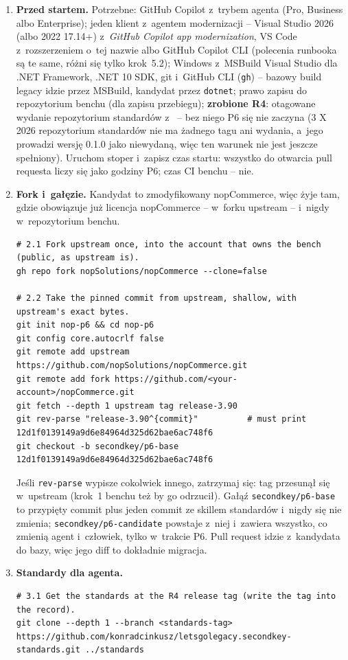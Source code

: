 \begin{enumerate}
  \item \textbf{Przed startem.} Potrzebne: GitHub Copilot z~trybem agenta (Pro, Business
    albo Enterprise); jeden klient z~agentem modernizacji -- Visual Studio 2026 (albo 2022
    17.14+) z~\emph{GitHub Copilot app modernization}, VS Code z~rozszerzeniem o~tej nazwie
    albo GitHub Copilot CLI (polecenia runbooka są te same, różni się tylko krok~5.2);
    Windows z~MSBuild Visual Studio dla .NET Framework, .NET 10 SDK, git i~GitHub CLI
    (\texttt{gh}) -- bazowy build legacy idzie przez MSBuild, kandydat przez
    \texttt{dotnet}; prawo zapisu do repozytorium benchu (dla zapisu przebiegu);
    \textbf{zrobione R4}: otagowane wydanie repozytorium standardów z~
    -- bez niego P6 się nie zaczyna (3 X 2026 repozytorium standardów nie ma żadnego tagu ani
    wydania, a~jego  prowadzi wersję 0.1.0 jako niewydaną, więc ten warunek
    nie jest jeszcze spełniony). Uruchom stoper i~zapisz czas startu: wszystko do
    otwarcia pull requesta liczy się jako godziny P6; czas CI benchu -- nie.
  \item \textbf{Fork i~gałęzie.} Kandydat to zmodyfikowany nopCommerce, więc żyje tam, gdzie
    obowiązuje już licencja nopCommerce -- w~forku upstream -- i~nigdy w~repozytorium
    benchu.
\begin{lstlisting}
# 2.1 Fork upstream once, into the account that owns the bench (public, as upstream is).
gh repo fork nopSolutions/nopCommerce --clone=false

# 2.2 Take the pinned commit from upstream, shallow, with upstream's exact bytes.
git init nop-p6 && cd nop-p6
git config core.autocrlf false
git remote add upstream https://github.com/nopSolutions/nopCommerce.git
git remote add fork https://github.com/<your-account>/nopCommerce.git
git fetch --depth 1 upstream tag release-3.90
git rev-parse "release-3.90^{commit}"          # must print 12d1f0139149a9d6e84964d325d62bae6ac748f6
git checkout -b secondkey/p6-base 12d1f0139149a9d6e84964d325d62bae6ac748f6
\end{lstlisting}
    Jeśli \texttt{rev-parse} wypisze cokolwiek innego, zatrzymaj się: tag przesunął się
    w~upstream (krok~1 benchu też by go odrzucił). Gałąź \texttt{secondkey/p6-base} to
    przypięty commit plus jeden commit ze skillem standardów i~nigdy się nie zmienia;
    \texttt{secondkey/p6-candidate} powstaje z~niej i~zawiera wszystko, co zmienią agent
    i~człowiek, tylko w~trakcie P6. Pull request idzie z~kandydata do bazy, więc jego diff
    to dokładnie migracja.
  \item \textbf{Standardy dla agenta.}
\begin{lstlisting}
# 3.1 Get the standards at the R4 release tag (write the tag into the record).
git clone --depth 1 --branch <standards-tag> https://github.com/konradcinkusz/letsgolegacy.secondkey-standards.git ../standards


\end{lstlisting}
\end{enumerate}
